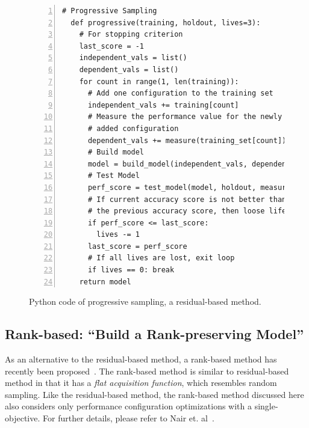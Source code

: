 \documentclass[10pt,journal,compsoc]{IEEEtran}
\begin{document}
\begin{figure}[t]
\small
\hspace{0.4cm}\begin{lstlisting}[xleftmargin=5.0ex,mathescape,frame=none,numbers=left]
  # Progressive Sampling
  def progressive(training, holdout, lives=3): 
    # For stopping criterion
    last_score = -1
    independent_vals = list()
    dependent_vals = list()
    for count in range(1, len(training)):    
      # Add one configuration to the training set
      independent_vals += training[count]      
      # Measure the performance value for the newly
      # added configuration 
      dependent_vals += measure(training_set[count])  
      # Build model
      model = build_model(independent_vals, dependent_vals)      
      # Test Model
      perf_score = test_model(model, holdout, measure(holdout))
      # If current accuracy score is not better than
      # the previous accuracy score, then loose life
      if perf_score <= last_score:
        lives -= 1
      last_score = perf_score
      # If all lives are lost, exit loop
      if lives == 0: break 
    return model
\end{lstlisting}
\caption{\small{Python code of progressive sampling, a residual-based method.}}
\label{fig:progressive_sampling}  
\end{figure}



\subsection{Rank-based: ``Build a Rank-preserving Model''}
As an alternative to the residual-based method, a rank-based method has recently been proposed~\cite{nair2017using}. 
The rank-based method is similar to residual-based method in that it has a \textit{flat acquisition function}, which resembles random sampling. Like the residual-based method, the rank-based method discussed here also considers only performance configuration optimizations with a single-objective. For further details, please refer to Nair et. al~\cite{nair2017using}.
\end{document}
